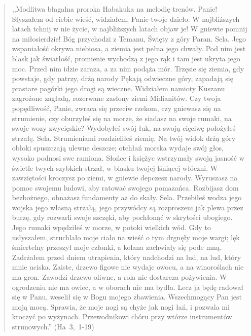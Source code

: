 \documentclass[10pt,a4paper,oneside]{article}
\begin{document}
\begin{quote}
,,Modlitwa błagalna proroka Habakuka na melodię trenów. Panie! Słyszałem od ciebie wieść, widziałem, Panie twoje dzieło. W najbliższych latach tchnij w nie życie, w najbliższych latach objaw je! W gniewie pomnij na miłosierdzie! Bóg przychodzi z Temanu, Święty z góry Paran. Sela. Jego wspaniałość okrywa niebiosa, a ziemia jest pełna jego chwały. Pod nim jest blask jak światłość, promienie wychodzą z jego rąk i tam jest ukryta jego moc. Przed nim idzie zaraza, a za nim podąża mór. Trzęsie się ziemia, gdy powstaje, gdy patrzy, drżą narody Pękają odwieczne góry, zapadają się prastare pagórki jego drogi są wieczne. Widziałem namioty Kuszanu zagrożone zagładą, rozerwane zasłony ziemi Midianitów. Czy twoja popędliwość, Panie, zwraca się przeciw rzekom, czy gniewasz się na strumienie, czy oburzyłeś się na morze, że siadasz na swoje rumaki, na swoje wozy zwycięskie? Wydobyłeś swój łuk, na swoją cięciwę położyłeś strzałę. Sela. Strumieniami rozdzieliłeś ziemię. Na twój widok drżą góry obłoki spuszczają ulewne deszcze; otchłań morska wydaje swój głos, wysoko podnosi swe ramiona. Słońce i księżyc wstrzymały swoją jasność w świetle twych szybkich strzał, w blasku twojej lśniącej włóczni. W zawziętości kroczysz po ziemi, w gniewie depczesz narody. Wyruszasz na pomoc swojemu ludowi, aby ratować swojego pomazańca. Rozbijasz dom bezbożnego, obnażasz fundamenty aż do skały. Sela. Przebiłeś wodza jego wojska jego własną strzałą, jego przywódcy są rozproszeni jak plewa przez burzę, gdy rozwarli swoje szczęki, aby pochłonąć w skrytości ubogiego. Jego rumaki wpędziłeś w morze, w potoki wielkich wód. Gdy to usłyszałem, struchlało moje ciało na wieść o tym drgnęły moje wargi; lęk śmiertelny przeszył moje członki, a kolana zachwiały się pode mną. Zadrżałem przed dniem utrapienia, który nadchodzi na lud, na lud, który mnie uciska. Zaiste, drzewo figowe nie wydaje owocu, a na winoroślach nie ma gron. Zawodzi drzewo oliwne, a rola nie dostarcza pożywienia. W ogrodzeniu nie ma owiec, a w oborach nie ma bydła. Lecz ja będę radował się w Panu, weselił się w Bogu mojego zbawienia. Wszechmogący Pan jest moją mocą. Sprawia, że moje nogi są chyże jak nogi łań, i pozwala mi kroczyć po wyżynach. Przewodnikowi chóru przy wtórze instrumentów strunowych.'' \mbox{(Ha 3, 1-19)}
\end{quote}
\end{document}
